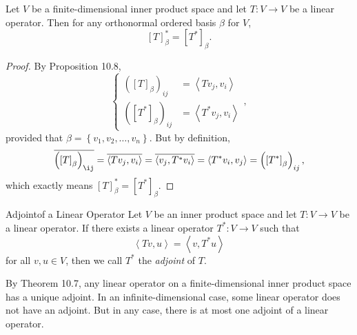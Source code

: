 \documentclass[linearalgebra]{subfiles}
\begin{document}
    \begin{cor}{}
        Let $V$ be a finite-dimensional inner product space and let $T:V\to V$ be a linear operator. Then for any orthonormal ordered basis $\beta$ for $V$,
        \begin{equation*}
            \left[ T \right] _\beta^* = \left[ T^* \right] _\beta.
        \end{equation*}
    \end{cor}	

    \begin{proof}
        By Proposition 10.8,
        \begin{equation*}
            \begin{cases} 
                \left( \left[ T \right] _\beta \right) _{ij} & = \left\langle Tv_j, v_i\right\rangle \\
                \left( \left[ T^* \right] _\beta \right) _{ij} & = \left\langle T^*v_j, v_i\right\rangle 
            \end{cases},
        \end{equation*}
        provided that $\beta = \left\lbrace v_1,v_2,\ldots,v_n \right\rbrace$. But by definition, 
        \begin{equation*}
            \overline{\left( \left[ T \right] _\beta \right) _{\ij}} = \overline{\left\langle Tv_j, v_i\right\rangle } = \overline{\left\langle v_j, T^*v_i\right\rangle} = \left\langle T^*v_i, v_j\right\rangle = \left( \left[ T^* \right] _\beta \right) _{ij},
        \end{equation*}
        which exactly means $\left[ T \right] _\beta^* = \left[ T^* \right] _\beta$.
    \end{proof}

    \begin{definition}{Adjoint}{of a Linear Operator}
        Let $V$ be an inner product space and let $T:V\to V$ be a linear operator. If there exists a linear operator $T^*:V\to V$ such that
        \begin{equation*}
            \left\langle Tv, u\right\rangle = \left\langle v, T^*u\right\rangle 
        \end{equation*}
        for all $v,u\in V$, then we call $T^*$ the \emph{adjoint} of $T$.
    \end{definition}

    \begin{remark}
        By Theorem 10.7, any linear operator on a finite-dimensional inner product space has a unique adjoint. In an infinite-dimensional case, some linear operator does not have an adjoint. But in any case, there is at most one adjoint of a linear operator.
    \end{remark}
\end{document}
